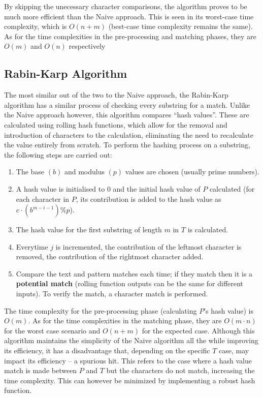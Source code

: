 \documentclass[12pt]{article}
\begin{document}
By skipping the unecessary character comparisons, the algorithm proves to be much
more efficient than the Naive approach. This is seen in its worst-case time complexity,
which is $O(n + m)$ (best-case time complexity remains the same). As for the time complexities in the pre-processing and matching phases, they are $O(m)$ and $O(n)$ respectively

\subsection{Rabin-Karp Algorithm}

\parencite{10} The most similar out of the two to the Naive approach, the Rabin-Karp algorithm
has a similar process of checking every substring for a match. Unlike the Naive approach
however, this algorithm compares “hash values”. These are calculated using rolling hash
functions, which allow for the removal and introduction of characters to the calculation,
eliminating the need to recalculate the value entirely from scratch. To perform the hashing
process on a substring, the following steps are carried out:

\begin{question}
\begin{enumerate}
	\item The base $(b)$ and modulus $(p)$ values are chosen (usually prime numbers).
	\item A hash value is initialised to 0 and the initial hash value of $P$ calculated (for each character in $P$, its contribution is added to the hash value as $c \cdot (b^{m-i-1}) \% p$).
	\item The hash value for the first substring of length $m$ in $T$ is calculated.
	\item Everytime $j$ is incremented, the contribution of the leftmost character is removed, the contribution of the rightmost character added.
	\item Compare the text and pattern matches each time; if they match then it is a \textbf{potential match} (rolling function outputs can be the same for different inputs). To verify the match, a character match is performed.
	
\end{enumerate}
\end{question}

The time complexity for the pre-processing phase (calculating $P$'s hash value) is $O(m)$.
As for the time complexities in the matching phase, they are $O(m \cdot n)$ for the worst case
scenario and $O(n + m)$ for the expected case. Although this algorithm maintains the
simplicity of the Naive algorithm all the while improving its efficiency, it has a disadvantage that, depending on the specific $T$ case, may impact its efficiency -- a spurious
hit. This refers to the case where a hash value match is made between $P$ and $T$ but the
characters do not match, increasing the time complexity. This can however be minimized
by implementing a robust hash function.
\end{document}
